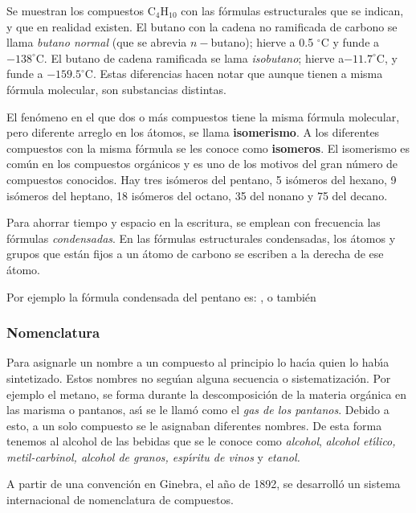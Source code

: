 Se muestran los compuestos  C$_4$H$_{10}$ con las f\'ormulas estructurales que se
indican, y que en realidad existen. El butano con la cadena no ramificada de carbono se
llama
\textit{butano normal} (que se abrevia $n-$butano); hierve a 0.5 $^\circ$C y funde a
$-138^\circ$C. El  butano de cadena ramificada se lama \textit{isobutano}; hierve a$-
11.7^\circ$C, y funde a $-159.5^\circ$C. Estas diferencias hacen notar que aunque
tienen a misma f\'ormula molecular, son substancias distintas.

El fen\'omeno en el que dos o m\'as compuestos tiene la misma f\'ormula molecular, pero
diferente arreglo en los \'atomos, se llama \textbf{isomerismo}. A los diferentes
compuestos con la misma f\'ormula se les conoce como \textbf{\gls{isomeros}}. 
 El isomerismo es com\'un en los compuestos org\'anicos y es uno de
los motivos del gran n\'umero de compuestos conocidos. Hay tres is\'omeros del pentano,
5 is\'omeros del hexano, 9 is\'omeros del heptano, 18 is\'omeros del octano, 35 del
nonano y 75 del decano.

Para ahorrar tiempo y espacio en la escritura, se emplean con frecuencia las f\'ormulas
\textit{condensadas}.  En las f\'ormulas estructurales condensadas, los
\'atomos y grupos que est\'an fijos a un \'atomo de carbono se escriben a la derecha de
ese \'atomo.

  Por ejemplo la f\'ormula condensada del pentano es:  
,
 o tambi\'en 

\subsubsection{Nomenclatura}

Para asignarle un nombre a un compuesto al principio lo hac\'{\i}a quien lo hab\'{\i}a
sintetizado. Estos nombres no segu\'{\i}an alguna secuencia o sistematizaci\'on. Por
ejemplo el metano, se forma durante la descomposici\'on de la materia org\'anica en las
marisma o pantanos, as\'{\i} se le llam\'o como el \textit{gas de los pantanos}. Debido
a esto, a un solo compuesto se le asignaban diferentes nombres. De esta forma tenemos al
alcohol de las bebidas que se le conoce como \textit{alcohol}, \textit{alcohol
et\'{\i}lico, metil-carbinol, alcohol de granos, esp\'{\i}ritu de vinos} y
\textit{etanol.}

A partir de una convenci\'on en Ginebra, el a\~no de 1892, se desarroll\'o un sistema internacional de nomenclatura de compuestos.

